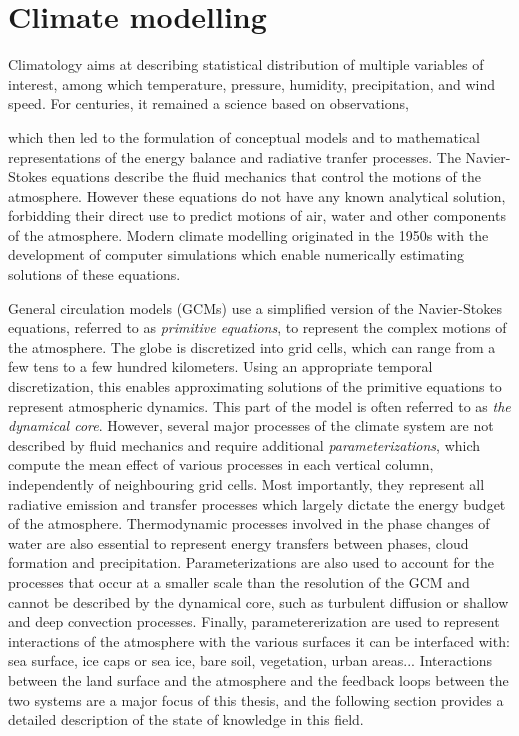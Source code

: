 \section{Climate modelling}
Climatology aims at describing statistical distribution of multiple variables of interest, among which temperature, pressure, humidity, precipitation, and wind speed.
For centuries, it remained a science based on observations, 

which then led to the formulation of conceptual models and to mathematical representations of the energy balance and radiative tranfer processes.
The Navier-Stokes equations describe the fluid mechanics that control the motions of the atmosphere. However these equations do not have any known analytical solution, forbidding their direct use to predict motions of air, water and other components of the atmosphere. 
Modern climate modelling originated in the 1950s with the development of computer simulations which enable numerically estimating solutions of these equations.

General circulation models (GCMs) use a simplified version of the Navier-Stokes equations, referred to as \textit{primitive equations}, to represent the complex motions of the atmosphere. 
The globe is discretized into grid cells, which can range from a few tens to a few hundred kilometers. Using an appropriate temporal discretization, this enables approximating solutions of the primitive equations to represent atmospheric dynamics. This part of the model is often referred to as \textit{the dynamical core}. However, several major processes of the climate system are not described by fluid mechanics and require additional \textit{parameterizations}, which compute the mean effect of various processes in each vertical column, independently of neighbouring grid cells. Most importantly, they represent all radiative emission and transfer processes which largely dictate the energy budget of the atmosphere.
Thermodynamic processes involved in the phase changes of water are also essential to represent energy transfers between phases, cloud formation and precipitation. Parameterizations are also used to account for the processes that occur at a smaller scale than the resolution of the GCM and cannot be described by the dynamical core, such as turbulent diffusion or shallow and deep convection processes. Finally, parametererization are used to represent interactions of the atmosphere with the various surfaces it can be interfaced with: sea surface, ice caps or sea ice, bare soil, vegetation, urban areas... Interactions between the land surface and the atmosphere and the feedback loops between the two systems are a major focus of this thesis, and the following section %
provides a detailed description of the state of knowledge in this field. 


